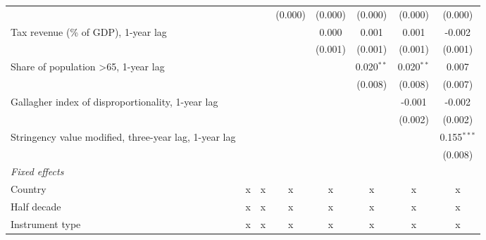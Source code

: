 \begin{tabular}{lccccccc}
                                                                   &                &                & (0.000)       & (0.000)       & (0.000)       & (0.000)       & (0.000)\\   
   Tax revenue (\% of GDP), 1-year lag                             &                &                &               & 0.000         & 0.001         & 0.001         & -0.002\\   
                                                                   &                &                &               & (0.001)       & (0.001)       & (0.001)       & (0.001)\\   
   Share of population >65, 1-year lag                             &                &                &               &               & 0.020$^{**}$  & 0.020$^{**}$  & 0.007\\   
                                                                   &                &                &               &               & (0.008)       & (0.008)       & (0.007)\\   
   Gallagher index of disproportionality, 1-year lag               &                &                &               &               &               & -0.001        & -0.002\\   
                                                                   &                &                &               &               &               & (0.002)       & (0.002)\\   
   Stringency value modified, three-year lag, 1-year lag           &                &                &               &               &               &               & 0.155$^{***}$\\   
                                                                   &                &                &               &               &               &               & (0.008)\\   
   \emph{Fixed effects}\\
   Country                                                         & x              & x              & x             & x             & x             & x             & x\\  
   Half decade                                                     & x              & x              & x             & x             & x             & x             & x\\  
   Instrument type                                                 & x              & x              & x             & x             & x             & x             & x\\  

\end{tabular}

